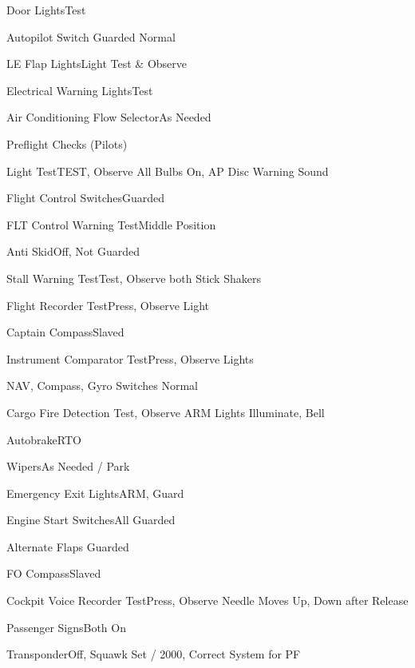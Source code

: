 \documentclass[sim-use]{checklist}
\begin{document}
\begin{continuedchecklist}
    \item{Door Lights}{Test}
    \item{Autopilot Switch} {Guarded Normal}
    \item{LE Flap Lights}{Light Test \& Observe}
    \item {Electrical Warning Lights}{Test}
    \item{Air Conditioning Flow Selector}{As Needed}
\end{continuedchecklist}

\begin{checklist}{Preflight Checks (Pilots)}
    \item{Light Test}{TEST, Observe All Bulbs On, AP Disc Warning Sound}
    \item{Flight Control Switches}{Guarded}
    \item{FLT Control Warning Test}{Middle Position}
    \item{Anti Skid}{Off, Not Guarded}
    \item{Stall Warning Test}{Test, Observe both Stick Shakers}
    \item{Flight Recorder Test}{Press, Observe Light}
    \item{Captain Compass}{Slaved}
    \item{Instrument Comparator Test}{Press, Observe Lights}
    \item {NAV, Compass, Gyro Switches} {Normal}
    \item{Cargo Fire Detection} {Test, Observe ARM Lights Illuminate, Bell}
    \item{Autobrake}{RTO}
    \item{Wipers}{As Needed / Park}
    \item{Emergency Exit Lights}{ARM, Guard}
    \item{Engine Start Switches}{All Guarded}
    \item {Alternate Flaps} {Guarded}
    \item {FO Compass}{Slaved}
    \item {Cockpit Voice Recorder Test}{Press, Observe Needle Moves Up, Down after Release}
    \item{Passenger Signs}{Both On}
    \item{Transponder}{Off, Squawk Set / 2000, Correct System for PF}
\end{checklist}
\end{document}
